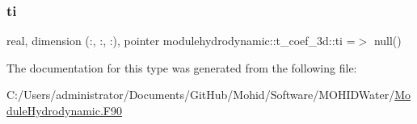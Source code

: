 \mbox{\label{structmodulehydrodynamic_1_1t__coef__3d_a444f10fb604e6ee056cd3290fdc532d8}} 
\subsubsection{\texorpdfstring{ti}{ti}}
{\footnotesize\ttfamily real, dimension (\+:, \+:, \+:), pointer modulehydrodynamic\+::t\+\_\+coef\+\_\+3d\+::ti =$>$ null()\hspace{0.3cm}{\ttfamily [private]}}



The documentation for this type was generated from the following file\+:\begin{DoxyCompactItemize}
\item 
C\+:/\+Users/administrator/\+Documents/\+Git\+Hub/\+Mohid/\+Software/\+M\+O\+H\+I\+D\+Water/\mbox{\hyperlink{_module_hydrodynamic_8_f90}{Module\+Hydrodynamic.\+F90}}\end{DoxyCompactItemize}
